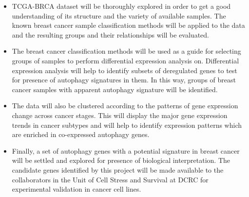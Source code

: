 \begin{itemize}
    
\item TCGA-BRCA dataset will be thoroughly explored in order to get a good understanding of its structure and the variety of available samples. The known breast cancer sample classification methods will be applied to the data and the resulting groups and their relationships will be evaluated.
\item The breast cancer classification methods will be used as a guide for selecting groups of samples to perform differential expression analysis on. Differential expression analysis will help to identify subsets of deregulated genes to test for presence of autophagy signatures in them. In this way, groups of breast cancer samples with apparent autophagy signature will be identified.
\item The data will also be clustered according to the patterns of gene expression change across cancer stages. This will display the major gene expression trends in cancer subtypes and will help to identify expression patterns which are enriched in co-expressed autophagy genes.
\item Finally, a set of autophagy genes with a potential signature in breast cancer will be settled and explored for presence of biological interpretation. The candidate genes identified by this project will be made available to the collaborators in the Unit of Cell Stress and Survival at DCRC for experimental validation in cancer cell lines. 

\end{itemize}
